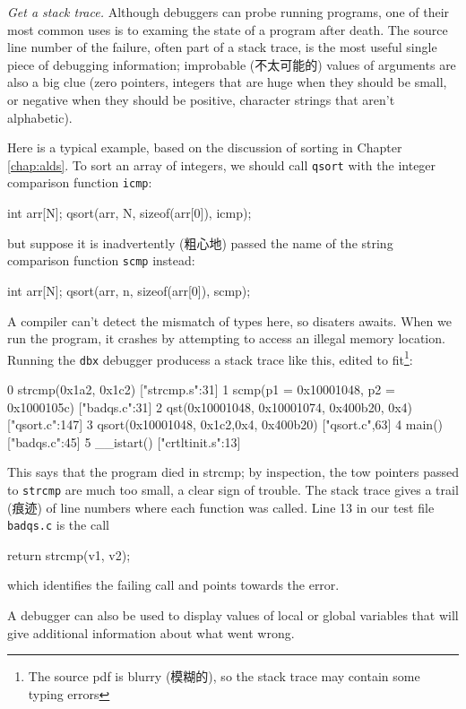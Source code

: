 \emph{Get a stack trace.} Although debuggers can probe running programs,
one of their most common uses is to examing the state of a program after
death. The source line number of the failure, often part of a stack trace,
is the most useful single piece of debugging information; improbable
(不太可能的) values of arguments are also a big clue (zero pointers,
integers that are huge when they should be small, or negative when they
should be positive, character strings that aren't alphabetic).

Here is a typical example, based on the discussion of sorting in Chapter
\ref{chap:alds}. To sort an array of integers, we should call \verb'qsort'
with the integer comparison function \verb'icmp':
\begin{wellcode}
    int arr[N];
    qsort(arr, N, sizeof(arr[0]), icmp);
\end{wellcode}
but suppose it is inadvertently (粗心地) passed the name of the string
comparison function \verb'scmp' instead:
\begin{badcode}
    int arr[N];
    qsort(arr, n, sizeof(arr[0]), scmp);
\end{badcode}
A compiler can't detect the mismatch of types here, so disaters awaits.
When we run the program, it crashes by attempting to access an illegal
memory location. Running the \verb'dbx' debugger producess a stack trace
like this, edited to fit\footnote{The source pdf is blurry (模糊的), so the
    stack trace may contain some typing errors}:
\begin{wellcode}
    0 strcmp(0x1a2, 0x1c2) ["strcmp.s":31]
    1 scmp(p1 = 0x10001048, p2 = 0x1000105c) ["badqs.c":31]
    2 qst(0x10001048, 0x10001074, 0x400b20, 0x4) ["qsort.c":147]
    3 qsort(0x10001048, 0x1c2,0x4, 0x400b20) ["qsort.c",63]
    4 main() ["badqs.c":45]
    5 __istart() ["crtltinit.s":13]
\end{wellcode}
This says that the program died in strcmp; by inspection, the tow pointers
passed to \verb'strcmp' are much too small, a clear sign of trouble. The
stack trace gives a trail (痕迹) of line numbers where each function was
called. Line 13 in our test file \verb'badqs.c' is the call 
\begin{wellcode}
    return strcmp(v1, v2);
\end{wellcode}
which identifies the failing call and points towards the error.

A debugger can also be used to display values of local or global variables
that will give additional information about what went wrong.

